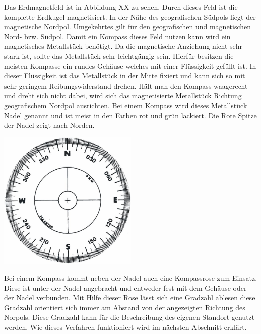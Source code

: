 Das Erdmagnetfeld ist in Abbildung XX zu sehen. Durch dieses Feld ist die komplette Erdkugel magnetisiert. In der Nähe des geografischen Südpols liegt der magnetische Nordpol. Umgekehrtes gilt für den geografischen und magnetischen Nord- bzw. Südpol.
Damit ein Kompass dieses Feld nutzen kann wird ein magnetisches Metallstück benötigt. Da die magnetische Anziehung nicht sehr stark ist, sollte das Metallstück sehr leichtgängig sein. Hierfür besitzen die meisten Kompasse ein rundes Gehäuse welches mit einer Flüssigkeit gefüllt ist. In dieser Flüssigkeit ist das Metallstück in der Mitte fixiert und kann sich so mit sehr geringem Reibungswiderstand drehen. Hält man den Kompass waagerecht und dreht sich nicht dabei, wird sich das magnetisierte Metallstück Richtung geografischem Nordpol ausrichten. Bei einem Kompass wird dieses Metallstück Nadel genannt und ist meist in den Farben rot und grün lackiert. Die Rote Spitze der Nadel zeigt nach Norden.

\includegraphics[width=0.50\textwidth]{ref/images/kompassrose.jpg}
 
Bei einem Kompass kommt neben der Nadel auch eine Kompassrose zum Einsatz. Diese ist unter der Nadel angebracht und entweder fest mit dem Gehäuse oder der Nadel verbunden. Mit Hilfe dieser Rose lässt sich eine Gradzahl ablesen diese Gradzahl orientiert sich immer am Abstand von der angezeigten Richtung des Norpols. Diese Gradzahl kann für die Beschreibung des eigenen Standort genutzt werden. Wie dieses Verfahren funktioniert wird im nächsten Abschnitt erklärt.

